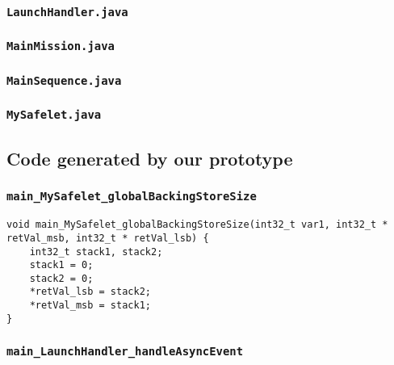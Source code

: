 \begin{landscape}
\begin{multicols}{2}
\subsubsection{\texttt{LaunchHandler.java}}


\subsubsection{\texttt{MainMission.java}}


\subsubsection{\texttt{MainSequence.java}}


\subsubsection{\texttt{MySafelet.java}}


\subsection{Code generated by our prototype}
\label{Barrier-code-our-subsection}

\subsubsection{\texttt{main\_MySafelet\_globalBackingStoreSize}}

\begin{lstlisting}[firstnumber=262]
void main_MySafelet_globalBackingStoreSize(int32_t var1, int32_t * retVal_msb, int32_t * retVal_lsb) {
	int32_t stack1, stack2;
	stack1 = 0;
	stack2 = 0;
	*retVal_lsb = stack2;
	*retVal_msb = stack1;
}
\end{lstlisting}

\subsubsection{\texttt{main\_LaunchHandler\_handleAsyncEvent}}


\end{multicols}
\end{landscape}
